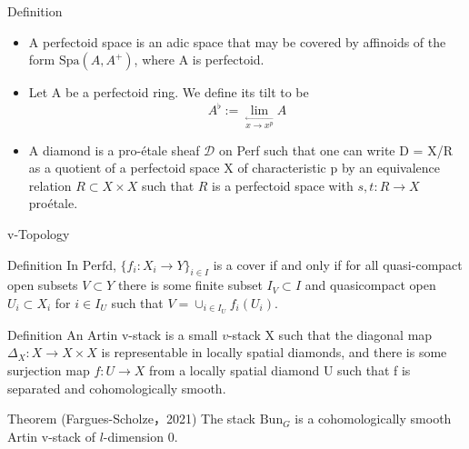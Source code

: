 \documentclass[aspectratio=1610]{ctexbeamer}
\def  \Bun      {\mathrm{Bun}}
\def  \Spa      {\mathrm{Spa}}
\def  \cd       {\mathcal{D}}
\begin{document}
\begin{frame}

\begin{block}{Definition}
	
	\begin{itemize}
		
\item 	A perfectoid space is an adic space that may be covered by affinoids of the form $\Spa (A,A^+)$, where A is perfectoid.	



\item 	Let A be a perfectoid ring. We define its tilt to be
	$$
	A^{\flat}:= \underset{\overset{\longleftarrow}{x \to x^p}} {\lim}A
	$$





\item 	A diamond is a pro-\'etale sheaf $\cd$ on Perf such that one
	can write D = X/R as a quotient of a perfectoid space X of characteristic p
	by an equivalence relation $R \subset X \times X$ such that $R$  is a perfectoid space with
	$s, t : R \to X $ pro\'etale.	
	
	\end{itemize}
\end{block}

\end{frame}









\begin{frame}{v-Topology} 

\begin{block}{Definition}
	In $\mathrm{Perfd}$, $\{ f_i: X_i \to Y\}_{i \in I}$ is a cover if and only if for all quasi-compact open subsets $V \subset Y$ there is some finite subset $I_V  \subset I$ and quasicompact open $U_i \subset X_i$ for $i \in I_U$ such that $V = \cup_{i \in I_U} f_i(U_i)$.
	
\end{block}


\begin{block}{Definition}
	An Artin v-stack is a small $v$-stack X such that the diagonal map $\Delta_X: X \to X \times X$ is representable  in locally spatial diamonds, and there is some surjection map $f: U \to X$ from a locally spatial diamond U such that f is separated and cohomologically smooth.
\end{block}


\begin{alertblock}{Theorem (Fargues-Scholze，2021)}
	The stack $\Bun_G$ is a cohomologically smooth Artin v-stack of $l$-dimension 0. 
\end{alertblock}

\end{frame}
\end{document}
